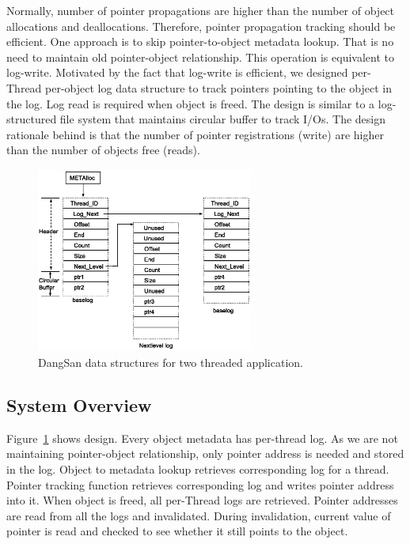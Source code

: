 Normally, number of pointer propagations are higher than the number of object allocations and deallocations. Therefore, pointer propagation tracking should be efficient. One approach is to  skip pointer-to-object metadata lookup. That is no need to maintain old pointer-object relationship. This operation is equivalent to log-write. Motivated by the fact that log-write is efficient, we designed per-Thread per-object log data structure to track pointers pointing to the object in the log. Log read is required when object is freed. The design is similar to a log-structured file system \cite{rosenblum1991design} that maintains circular buffer to track I/Os. The design rationale behind \projectname{} is that the number of pointer registrations (write) are higher than the number of objects free (reads).

\begin{figure}[t]
\center
  \includegraphics[width=2.8in,height=2.4in,keepaspectratio]{figures/dangsang_design.eps}
  \caption{DangSan data structures for two threaded application.}
  \label{fig:dangsang_design}
  \vspace{-1em}
\end{figure}

\subsection{System Overview}
Figure~\ref{fig:dangsang_design} shows \projectname{} design. Every object metadata has per-thread log. As we are not maintaining pointer-object relationship, only pointer address is needed and stored in the log. Object to metadata lookup retrieves corresponding log for a thread. Pointer tracking function retrieves corresponding log and writes pointer address into it. When object is freed, all per-Thread logs are retrieved. Pointer addresses are read from all the logs and invalidated. During invalidation, current value of pointer is read and checked to see whether it still points to the object. \\  

